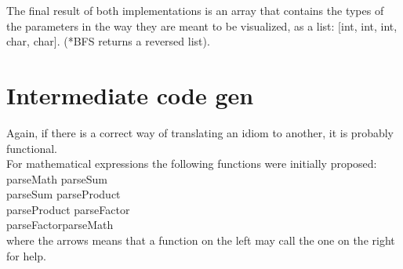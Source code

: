 \documentclass[twocolumn,10ptr]{article}
\begin{document}
	The final result of both implementations is an array that contains the types of the parameters in the way they are meant to be visualized, as a list: [int, int, int, char, char]. (*BFS returns a reversed list).

	
	
	
	
	
	
	\section{Intermediate code gen}
	Again, if there is a correct way of translating an idiom to another, it is probably functional.\\
	For mathematical expressions the following functions were initially proposed: \\
	
	
	parseMath \textrightarrow parseSum\\	
	
	parseSum \textrightarrow parseProduct\\	
	
	parseProduct \textrightarrow parseFactor\\	
	
	parseFactor\textrightarrow parseMath\\
	
	where the arrows means that a function on the left may call the one on the right for help. \\
	
	
	
	
\end{document}
